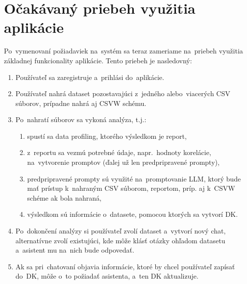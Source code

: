 \section{Očakávaný priebeh využitia aplikácie}

Po~vymenovaní požiadaviek na~systém sa teraz zameriame na~priebeh využitia základnej funkcionality aplikácie. Tento priebeh je nasledovný:
\begin{enumerate}
\item Používateľ sa zaregistruje a~prihlási do~aplikácie.
\item Používateľ nahrá dataset pozostavajúci z~jedného alebo~viacerých CSV súborov, prípadne nahrá aj CSVW schému.
\item Po~nahratí súborov sa vykoná analýza, t.j.:
\begin{enumerate}
\item spustí sa data profiling, ktorého výsledkom je report,
\item z~reportu sa vezmú potrebné údaje, napr.~hodnoty korelácie, na~vytvorenie promptov (ďalej už len predpripravené prompty),
\item predpripravené prompty sú využité na~promptovanie LLM, ktorý bude mať prístup k~nahraným CSV súborom, reportom, príp. aj k~CSVW schéme ak bola nahraná,
\item výsledkom sú informácie o~datasete, pomocou ktorých sa vytvorí DK. \end{enumerate}
\item Po~dokončení analýzy si používateľ zvolí dataset a~vytvorí nový chat, alternatívne zvolí existujúci, kde môže klásť otázky ohľadom datasetu a~asistent mu na~nich bude odpovedať.
\item Ak sa pri~chatovaní objavia informácie, ktoré by chcel používateľ zapísať do~DK, môže o~to požiadať asistenta, a~ten DK aktualizuje. \end{enumerate}
